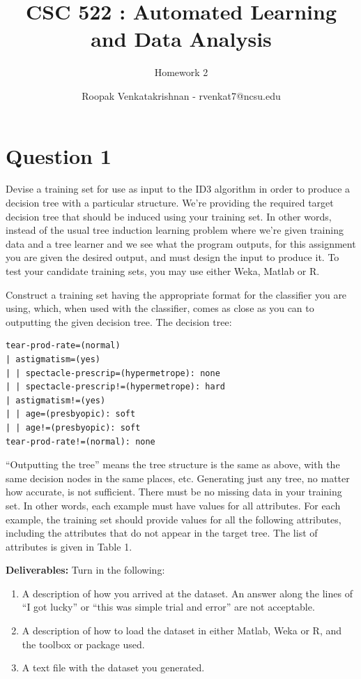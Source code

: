 \documentclass[fontsize=10pt]{scrartcl}
\begin{document}
	\title{CSC 522 : Automated Learning and Data Analysis}
	\subtitle{Homework 2}
	\author{Roopak Venkatakrishnan - rvenkat7@ncsu.edu}
	\maketitle

	\section{Question 1}
	Devise a training set for use as input to the ID3 algorithm in order to produce a decision tree with a particular structure. We’re providing the required target decision tree that should be induced using your training set. In other words, instead of the usual tree induction learning problem where we’re given training data and a tree learner and we see what the program outputs, for this assignment you are given the desired output, and must design the input to produce it. To test your candidate training sets, you may use either Weka, Matlab or R.

	Construct a training set having the appropriate format for the classifier you are using, which, when used with the classifier, comes as close as you can to outputting the given decision tree. The decision tree:
\begin{verbatim}
tear-prod-rate=(normal)
| astigmatism=(yes)
| | spectacle-prescrip=(hypermetrope): none
| | spectacle-prescrip!=(hypermetrope): hard
| astigmatism!=(yes)
| | age=(presbyopic): soft
| | age!=(presbyopic): soft
tear-prod-rate!=(normal): none

\end{verbatim}

	``Outputting the tree'' means the tree structure is the same as above, with the same decision nodes in the same places, etc. Generating just any tree, no matter how accurate, is not sufficient. There must be no missing data in your training set. In other words, each example must have values for all attributes. For each example, the training set should provide values for all the following attributes, including the attributes that do not appear in the target tree. The list of attributes is given in Table 1.

	\textbf{Deliverables:} Turn in the following:
	\begin{enumerate}
	\item
	A description of how you arrived at the dataset. An answer along the lines of “I got lucky” or “this was simple trial and error” are not acceptable.

	\item
	A description of how to load the dataset in either Matlab, Weka or R, and the toolbox or package used.

	\item
	A text file with the dataset you generated.
	\end{enumerate}
\end{document}
